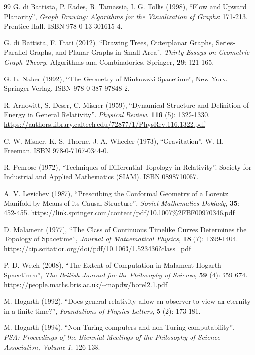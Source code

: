 \documentclass{article}
\begin{document}
\begin{thebibliography}{99}
G. di Battista, P. Eades, R. Tamassia, I. G. Tollis (1998), ``Flow and Upward Planarity'', \textit{Graph Drawing: Algorithms for the Visualization of Graphs}: 171-213. Prentice Hall. ISBN 978-0-13-301615-4.

G. di Battista, F. Frati (2012), ``Drawing Trees, Outerplanar Graphs, Series-Parallel Graphs, and Planar Graphs in Small Area'', \textit{Thirty Essays on Geometric Graph Theory}, Algorithms and Combinatorics, Springer, \textbf{29}: 121-165.

G. L. Naber (1992), ``The Geometry of Minkowski Spacetime'', New York: Springer-Verlag. ISBN 978-0-387-97848-2.

R. Arnowitt, S. Deser, C. Misner (1959), ``Dynamical Structure and Definition of Energy in General Relativity'', \textit{Physical Review}, \textbf{116} (5): 1322-1330. \url{https://authors.library.caltech.edu/72877/1/PhysRev.116.1322.pdf}

C. W. Misner, K. S. Thorne, J. A. Wheeler (1973), ``Gravitation''. W. H. Freeman. ISBN 978-0-7167-0344-0.

R. Penrose (1972), ``Techniques of Differential Topology in Relativity''. Society for Industrial and Applied Mathematics (SIAM). ISBN 0898710057.

A. V. Levichev (1987), ``Prescribing the Conformal Geometry of a Lorentz Manifold by Means of its Causal Structure'', \textit{Soviet Mathematics Doklady}, \textbf{35}: 452-455. \url{https://link.springer.com/content/pdf/10.1007%2FBF00970346.pdf}

D. Malament (1977), ``The Class of Continuous Timelike Curves Determines the Topology of Spacetime'', \textit{Journal of Mathematical Physics}, \textbf{18} (7): 1399-1404. \url{https://aip.scitation.org/doi/pdf/10.1063/1.523436?class=pdf}

P. D. Welch (2008), ``The Extent of Computation in Malament-Hogarth Spacetimes'', \textit{The British Journal for the Philosophy of Science}, \textbf{59} (4): 659-674. \url{https://people.maths.bris.ac.uk/~mapdw/borel2.1.pdf}

M. Hogarth (1992), ``Does general relativity allow an observer to view an eternity in a finite time?'', \textit{Foundations of Physics Letters}, \textbf{5} (2): 173-181.

M. Hogarth (1994), ``Non-Turing computers and non-Turing computability'', \textit{PSA: Proceedings of the Biennial Meetings of the Philosophy of Science Association, Volume 1}: 126-138.


\end{thebibliography}
\end{document}
